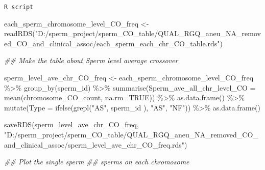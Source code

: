 \documentclass[
  letterpaper,
  DIV=11,
  numbers=noendperiod]{scrreprt}
\newenvironment{Shaded}{\begin{snugshade}}{\end{snugshade}}
\newcommand{\AttributeTok}[1]{\textcolor[rgb]{0.40,0.45,0.13}{#1}}
\newcommand{\ConstantTok}[1]{\textcolor[rgb]{0.56,0.35,0.01}{#1}}
\newcommand{\DocumentationTok}[1]{\textcolor[rgb]{0.37,0.37,0.37}{\textit{#1}}}
\newcommand{\FunctionTok}[1]{\textcolor[rgb]{0.28,0.35,0.67}{#1}}
\newcommand{\NormalTok}[1]{\textcolor[rgb]{0.00,0.23,0.31}{#1}}
\newcommand{\OtherTok}[1]{\textcolor[rgb]{0.00,0.23,0.31}{#1}}
\newcommand{\SpecialCharTok}[1]{\textcolor[rgb]{0.37,0.37,0.37}{#1}}
\newcommand{\StringTok}[1]{\textcolor[rgb]{0.13,0.47,0.30}{#1}}
\begin{document}
\begin{codelisting}

\caption{\texttt{R script}}

\begin{Shaded}
\begin{Highlighting}[]
\NormalTok{each\_sperm\_chromosome\_level\_CO\_freq }\OtherTok{\textless{}{-}} \FunctionTok{readRDS}\NormalTok{(}\StringTok{"D:/sperm\_project/sperm\_CO\_table/QUAL\_RGQ\_aneu\_NA\_removed\_CO\_and\_clinical\_assoc/each\_sperm\_each\_chr\_CO\_table.rds"}\NormalTok{)}

\DocumentationTok{\#\# Make the table about Sperm level average crossover}

\NormalTok{sperm\_level\_ave\_chr\_CO\_freq }\OtherTok{\textless{}{-}}\NormalTok{ each\_sperm\_chromosome\_level\_CO\_freq }\SpecialCharTok{\%\textgreater{}\%} 
  \FunctionTok{group\_by}\NormalTok{(sperm\_id) }\SpecialCharTok{\%\textgreater{}\%} 
  \FunctionTok{summarise}\NormalTok{(}\AttributeTok{Sperm\_ave\_all\_chr\_level\_CO =} \FunctionTok{mean}\NormalTok{(chromosome\_CO\_count, }\AttributeTok{na.rm=}\ConstantTok{TRUE}\NormalTok{)) }\SpecialCharTok{\%\textgreater{}\%}  \FunctionTok{as.data.frame}\NormalTok{() }\SpecialCharTok{\%\textgreater{}\%}
  \FunctionTok{mutate}\NormalTok{(}\AttributeTok{Type =} \FunctionTok{ifelse}\NormalTok{(}\FunctionTok{grepl}\NormalTok{(}\StringTok{"AS"}\NormalTok{, sperm\_id ), }\StringTok{"AS"}\NormalTok{, }\StringTok{"NF"}\NormalTok{)) }\SpecialCharTok{\%\textgreater{}\%} \FunctionTok{as.data.frame}\NormalTok{()}

\FunctionTok{saveRDS}\NormalTok{(sperm\_level\_ave\_chr\_CO\_freq, }\StringTok{"D:/sperm\_project/sperm\_CO\_table/QUAL\_RGQ\_aneu\_NA\_removed\_CO\_and\_clinical\_assoc/sperm\_level\_ave\_chr\_CO\_freq.rds"}\NormalTok{)}

\DocumentationTok{\#\# Plot the single sperm }
\DocumentationTok{\#\# sperms on each chromosome}


\end{Highlighting}
\end{Shaded}
\end{codelisting}
\end{document}
